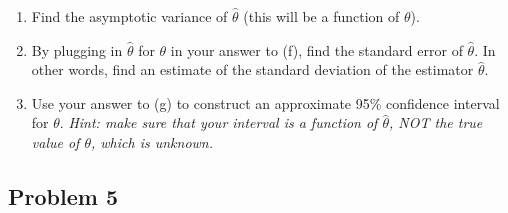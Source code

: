 \documentclass{article}
\newcommand{\1}{\mathbf{1}}
\begin{document}
\begin{enumerate}
    \item Find the asymptotic variance of $\hat{\theta}$ (this will be a function of $\theta$).
    \item By plugging in $\hat{\theta}$ for $\theta$ in your answer to (f), find the standard error of $\hat{\theta}$. In other words, find an estimate of the standard deviation of the estimator $\hat{\theta}$.
    \item Use your answer to (g) to construct an approximate 95\% confidence interval for $\theta$. {\it Hint: make sure that your interval is a function of $\hat{\theta}$, NOT the true value of $\theta$, which is unknown.}
\end{enumerate}


\newpage
\subsection*{Problem 5}
\end{document}
